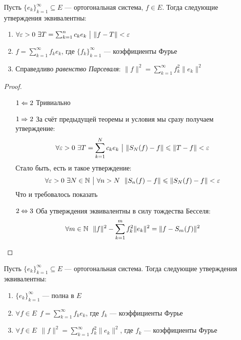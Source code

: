 \begin{theorem}
	Пусть $\{e_k\}_{k = 1}^\infty \subseteq E$ --- ортогональная система, $f \in E$. Тогда следующие утверждения эквивалентны:
	\begin{enumerate}
		\item $\forall \varepsilon > 0\ \exists T = \sum_{k = 1}^n c_ke_k \ \big|\  \|f - T\| < \varepsilon$
		
		\item $f = \sum_{k = 1}^\infty f_ke_k$, где $\{f_k\}_{k = 1}^\infty$ --- коэффициенты Фурье
		
		\item Справедливо \textit{равенство Парсеваля}: $\|f\|^2 = \sum_{k = 1}^\infty f_k^2\|e_k\|^2$
	\end{enumerate}
\end{theorem}

\begin{proof}~
	\begin{itemize}
		\item[$1 \Leftarrow 2$] Тривиально
		
		\item[$1 \Rightarrow 2$] За счёт предыдущей теоремы и условия мы сразу получаем утверждение:
		\[
			\forall \varepsilon > 0\ \exists T = \sum_{k = 1}^N c_ke_k \ \big|\  \|S_N(f) - f\| \leqslant \|T - f\| < \varepsilon
		\]
		Стало быть, есть и такое утверждение:
		\[
			\forall \varepsilon > 0\ \exists N \in \mathbb{N} \ \big|\  \forall n > N\ \ \|S_n(f) - f\| \leqslant \|S_N(f) - f\| < \varepsilon
		\]
		Что и требовалось показать
		
		\item[$2 \Leftrightarrow 3$] Оба утверждения эквивалентны в силу тождества Бесселя:
		\[
			\forall m \in \mathbb{N}\ \ \|f\|^2 - \sum_{k = 1}^m f_k^2\|e_k\|^2 = \|f - S_m(f)\|^2
		\]
	\end{itemize}
\end{proof}

\begin{corollary}
	Пусть $\{e_k\}_{k = 1}^\infty \subseteq E$ --- ортогональная система. Тогда следующие утверждения эквивалентны:
	\begin{enumerate}
		\item $\{e_k\}_{k = 1}^\infty$ --- полна в $E$
		
		\item $\forall f \in E\ \ f = \sum_{k = 1}^\infty f_ke_k$, где $f_k$ --- коэффициенты Фурье
		
		\item $\forall f \in E\ \ \|f\|^2 = \sum_{k = 1}^\infty f_k^2\|e_k\|^2$, где $f_k$ --- коэффициенты Фурье
	\end{enumerate}
\end{corollary}

